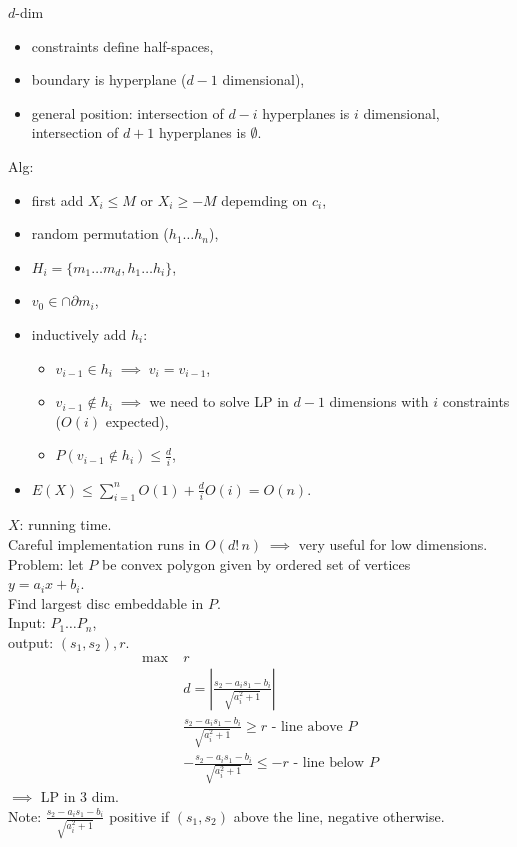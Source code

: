 \documentclass[a4paper, 12pt]{book}
\theoremstyle{definition}
\theoremstyle{remark}
\begin{document}
$d$-dim
\begin{itemize}
  \item constraints define half-spaces,
  \item boundary is hyperplane ($d-1$ dimensional),
  \item general position: intersection of $d-i$ hyperplanes is $i$ dimensional,
    intersection of $d+1$ hyperplanes is $\emptyset$.
\end{itemize}
Alg:
\begin{itemize}[label={}]
  \item first add $X_i \leq M$ or $X_i \geq -M$ depemding on $c_i$,
  \item random permutation ($h_1 \dots h_n$),
  \item $H_i = \{m_1 \dots m_d, h_1 \dots h_i\}$,
  \item $v_0 \in \cap \partial m_i$,
  \item inductively add $h_i$:
    \begin{itemize}[label={}]
      \item $v_{i-1} \in h_i \; \implies \; v_i = v_{i-1}$,
      \item $v_{i-1} \notin h_i \; \implies$
        we need to solve LP in $d-1$ dimensions with $i$ constraints ($O(i)$ expected),
      \item $P(v_{i-1} \notin h_i) \leq \frac{d}{i}$,
    \end{itemize}
  \item $E(X) \leq \sum_{i=1}^{n} O(1) + \frac{d}{i} O(i) = O(n)$.
\end{itemize}
$X$: running time. \\
Careful implementation runs in $O(d! \, n) \; \implies$ very useful for low dimensions. \\
Problem: let $P$ be convex polygon given by ordered set of vertices \\
$y = a_i x + b_i$. \\
Find largest disc embeddable in $P$. \\
Input: $P_1 \dots P_n$, \\
output: $(s_1, s_2), r$.
\begin{align*}
  \max \; &r \\
  &d = \left| \frac{s_2 - a_i s_1 - b_i}{\sqrt{a_i^2 + 1}}\right| \\
  &\frac{s_2 - a_i s_1 - b_i}{\sqrt{a_i^2 + 1}} \geq r \text{ - line above } P \\
  &-\frac{s_2 - a_i s_1 - b_i}{\sqrt{a_i^2 + 1}} \leq -r \text{ - line below } P
\end{align*}
$\implies$ LP in 3 dim. \\
Note: $\frac{s_2 - a_i s_1 - b_i}{\sqrt{a_i^2 + 1}}$ positive if $(s_1, s_2)$ above the line,
negative otherwise.
\end{document}
